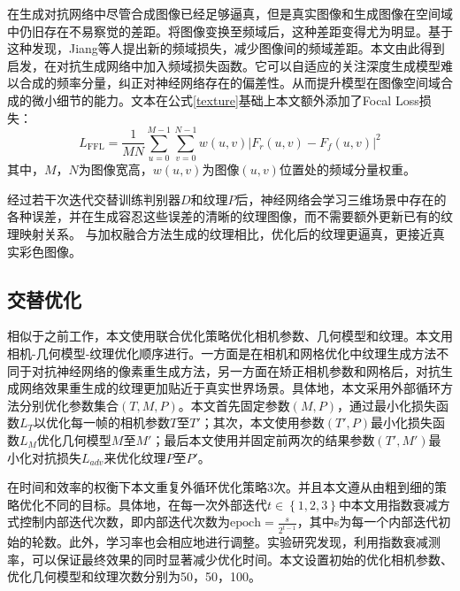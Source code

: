 在生成对抗网络中尽管合成图像已经足够逼真，但是真实图像和生成图像在空间域中仍旧存在不易察觉的差距。将图像变换至频域后，这种差距变得尤为明显。基于这种发现，Jiang等人提出新的频域损失，减少图像间的频域差距。本文由此得到启发，在对抗生成网络中加入频域损失函数。它可以自适应的关注深度生成模型难以合成的频率分量，纠正对神经网络存在的偏差性。从而提升模型在图像空间域合成的微小细节的能力。文本在公式\eqref{texture}基础上本文额外添加了Focal Loss损失：
\begin{equation}
	L_\mathrm{FFL}=\frac{1}{M N} \sum_{u=0}^{M-1} \sum_{v=0}^{N-1} w(u, v)\left|F_{r}(u, v)-F_{f}(u, v)\right|^{2}
\end{equation}
其中，$M，N$为图像宽高，$w(u, v)$为图像$(u,v)$位置处的频域分量权重。\par
经过若干次迭代交替训练判别器$D$和纹理$P$后，神经网络会学习三维场景中存在的各种误差，并在生成容忍这些误差的清晰的纹理图像，而不需要额外更新已有的纹理映射关系。 与加权融合方法生成的纹理相比，优化后的纹理更逼真，更接近真实彩色图像。\par

\subsection{交替优化}
相似于之前工作，本文使用联合优化策略优化相机参数、几何模型和纹理。本文用相机-几何模型-纹理优化顺序进行。一方面是在相机和网格优化中纹理生成方法不同于对抗神经网络的像素重生成方法，另一方面在矫正相机参数和网格后，对抗生成网络效果重生成的纹理更加贴近于真实世界场景。具体地，本文采用外部循环方法分别优化参数集合$(T,M,P)$。本文首先固定参数$(M,P)$，通过最小化损失函数$L_T$以优化每一帧的相机参数$T$至$T'$；其次，本文使用参数$(T',P)$最小化损失函数$L_M$优化几何模型$M$至$M'$；最后本文使用并固定前两次的结果参数$(T',M')$最小化对抗损失$L_{adv}$来优化纹理$P$至$P'$。\par
在时间和效率的权衡下本文重复外循环优化策略3次。并且本文遵从由粗到细的策略优化不同的目标。具体地，在每一次外部迭代$t\in \left \{ 1,2,3 \right \}$中本文用指数衰减方式控制内部迭代次数，即内部迭代次数为$\text{epoch}  =\frac{s}{2^{t-1}}$，其中s为每一个内部迭代初始的轮数。此外，学习率也会相应地进行调整。实验研究发现，利用指数衰减测率，可以保证最终效果的同时显著减少优化时间。本文设置初始的优化相机参数、优化几何模型和纹理次数分别为50，50，100。

